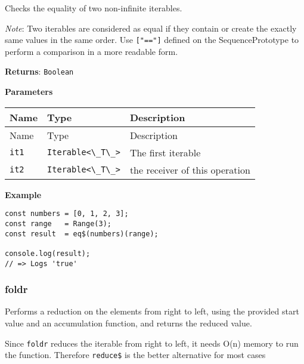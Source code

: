 Checks the equality of two non-infinite iterables.

\emph{Note}: Two iterables are considered as equal if they contain or
create the exactly same values in the same order. Use
\passthrough{\lstinline!["=="]!} defined on the SequencePrototype to
perform a comparison in a more readable form.

\textbf{Returns}: \passthrough{\lstinline!Boolean!}

\textbf{Parameters}

\begin{longtable}[]{
  >{\raggedright\arraybackslash}p{}
  >{\raggedright\arraybackslash}p{}
  >{\raggedright\arraybackslash}p{}@{}}

\toprule\noalign{}
Name & Type & Description \\
\midrule\noalign{}
\endfirsthead
\toprule\noalign{}
Name & Type & Description \\
\midrule\noalign{}
\endhead
\bottomrule\noalign{}
\endlastfoot
\passthrough{\lstinline!it1!} &
\passthrough{\lstinline!Iterable<\_T\_>!} & The first iterable \\
\passthrough{\lstinline!it2!} &
\passthrough{\lstinline!Iterable<\_T\_>!} & the receiver of this
operation \\
\end{longtable}

\textbf{Example}

\begin{lstlisting}[label=b46ef356-2dcb-4c5a-b345-f74828804c55]
const numbers = [0, 1, 2, 3];
const range   = Range(3);
const result  = eq$(numbers)(range);
                                    
console.log(result);
// => Logs 'true'
\end{lstlisting}

\hypertarget{ef923738-324f-424a-8151-1706b42a416d}{%
\subsubsection{foldr}\label{ef923738-324f-424a-8151-1706b42a416d}}

Performs a reduction on the elements from right to left, using the
provided start value and an accumulation function, and returns the
reduced value.

Since \passthrough{\lstinline!foldr!} reduces the iterable from right to
left, it needs O(n) memory to run the function. Therefore
\passthrough{\lstinline!reduce$!} is the better alternative for most
cases


